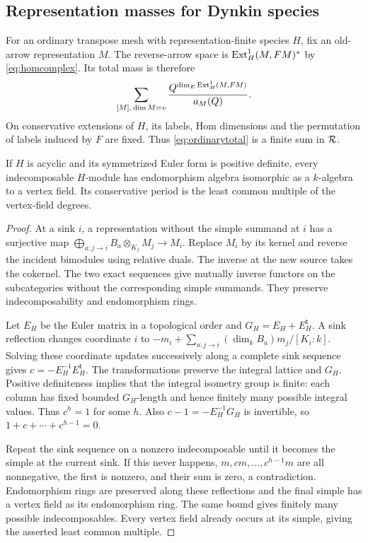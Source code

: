 \subsection{Representation masses for Dynkin species}
For an ordinary transpose mesh with representation-finite species $H$, fix an old-arrow representation $M$. The reverse-arrow space is $\operatorname{Ext}_H^1(M,FM)^*$ by \eqref{eq:homcomplex}. Its total mass is therefore
\begin{equation}\label{eq:ordinarytotal}
 \sum_{[M],\,\dim M=v}\frac{Q^{\dim_E\operatorname{Ext}_H^1(M,FM)}}{a_M(Q)}.
\end{equation}
On conservative extensions of $H$, its labels, Hom dimensions and the permutation of labels induced by $F$ are fixed. Thus \eqref{eq:ordinarytotal} is a finite sum in $\mathcal R$.

\begin{lemma}\label{lem:residues}
If $H$ is acyclic and its symmetrized Euler form is positive definite, every indecomposable $H$-module has endomorphism algebra isomorphic as a $k$-algebra to a vertex field. Its conservative period is the least common multiple of the vertex-field degrees.
\end{lemma}
\begin{proof}
At a sink $i$, a representation without the simple summand at $i$ has a surjective map
$\bigoplus_{a:j\to i}B_a\otimes_{K_j}M_j\to M_i$.
Replace $M_i$ by its kernel and reverse the incident bimodules using relative duals. The inverse at the new source takes the cokernel. The two exact sequences give mutually inverse functors on the subcategories without the corresponding simple summands. They preserve indecomposability and endomorphism rings.

Let $E_H$ be the Euler matrix in a topological order and $G_H=E_H+E_H^{\mathsf t}$. A sink reflection changes coordinate $i$ to
$-m_i+\sum_{a:j\to i}(\dim_kB_a)m_j/[K_i:k]$.
Solving these coordinate updates successively along a complete sink sequence gives $c=-E_H^{-1}E_H^{\mathsf t}$. The transformations preserve the integral lattice and $G_H$. Positive definiteness implies that the integral isometry group is finite: each column has fixed bounded $G_H$-length and hence finitely many possible integral values. Thus $c^h=1$ for some $h$. Also $c-1=-E_H^{-1}G_H$ is invertible, so $1+c+\cdots+c^{h-1}=0$.

Repeat the sink sequence on a nonzero indecomposable until it becomes the simple at the current sink. If this never happens, $m,cm,\ldots,c^{h-1}m$ are all nonnegative, the first is nonzero, and their sum is zero, a contradiction. Endomorphism rings are preserved along these reflections and the final simple has a vertex field as its endomorphism ring. The same bound gives finitely many possible indecomposables. Every vertex field already occurs at its simple, giving the asserted least common multiple.
\end{proof}
